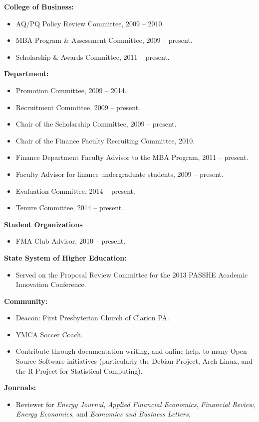 \documentclass[9pt]{article}
\begin{document}
{\bf College of Business:}
\begin{itemize}[noitemsep, nolistsep]
\item AQ/PQ Policy Review Committee, 2009 -- 2010.
\item MBA Program \& Assessment Committee, 2009 -- present.
\item Scholarship \& Awards Committee, 2011 -- present.
\end{itemize}
{\bf Department:}
\begin{itemize}[noitemsep, nolistsep]
\item Promotion Committee, 2009 -- 2014.
\item Recruitment Committee, 2009 -- present.
\item Chair of the Scholarship Committee, 2009 -- present.
\item Chair of the Finance Faculty Recruiting Committee, 2010.
\item Finance Department Faculty Advisor to the MBA Program, 2011 -- present.
\item Faculty Advisor for finance undergraduate students, 2009 -- present.
\item Evaluation Committee, 2014 -- present.
\item Tenure Committee, 2014 -- present.
\end{itemize}
{\bf Student Organizations}
\begin{itemize}[noitemsep, nolistsep]
\item FMA Club Advisor, 2010 -- present.
\end{itemize}
{\bf State System of Higher Education:}
\begin{itemize}[noitemsep, nolistsep]
\item Served on the Proposal Review Committee for the 2013 PASSHE Academic Innovation Conference.
\end{itemize}
{\bf Community:}
\begin{itemize}[noitemsep, nolistsep]
\item Deacon: First Presbyterian Church of Clarion PA.
\item YMCA Soccer Coach.
\item Contribute through documentation writing, and online help, to many Open Source Software initiatives (particularly the Debian Project, Arch Linux, and the R Project for Statistical Computing).
\end{itemize}
{\bf Journals:}
\begin{itemize}[noitemsep, nolistsep]
\item Reviewer for {\it Energy Journal}, {\it Applied Financial Economics}, {\it Financial Review}, {\it Energy Economics}, and {\it Economics and Business Letters}.
\end{itemize}
\end{document}
